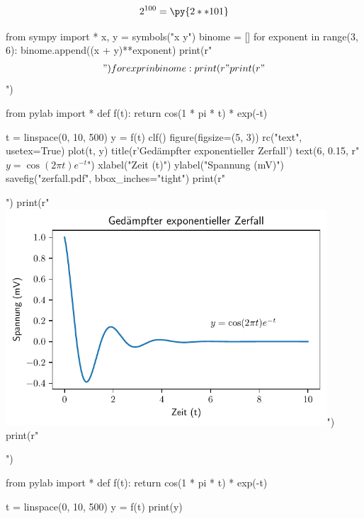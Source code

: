 \documentclass[12pt,ngerman]{scrartcl}
\begin{document}

\[
2^{100} = \py{2**101}
\]

\begin{pycode}
from sympy import *
x, y = symbols("x y")
binome = []
for exponent in range(3, 6):
    binome.append((x + y)**exponent)
    print(r"\begin{align*}")
    for expr in binome:
        print(r"%
    print(r"\end{align*}")
\end{pycode}



\begin{pycode}
from pylab import *
def f(t):
    return cos(1 * pi * t) * exp(-t)

t = linspace(0, 10, 500)
y = f(t)
clf()
figure(figsize=(5, 3))
rc("text", usetex=True)
plot(t, y)
title(r'Ged\"ampfter exponentieller Zerfall') 
text(6, 0.15, r"$y = \cos(2 \pi t) e^{-t}$")
xlabel("Zeit (t)")
ylabel("Spannung (mV)")
savefig("zerfall.pdf", bbox_inches="tight")
print(r"\begin{center}")
print(r"\includegraphics[width=0.9\textwidth]{zerfall.pdf}")
print(r"\end{center}")
\end{pycode}

\begin{pycode}
from pylab import *
def f(t):
    return cos(1 * pi * t) * exp(-t)

t = linspace(0, 10, 500)
y = f(t)
print(y)
\end{pycode}
\end{document}
